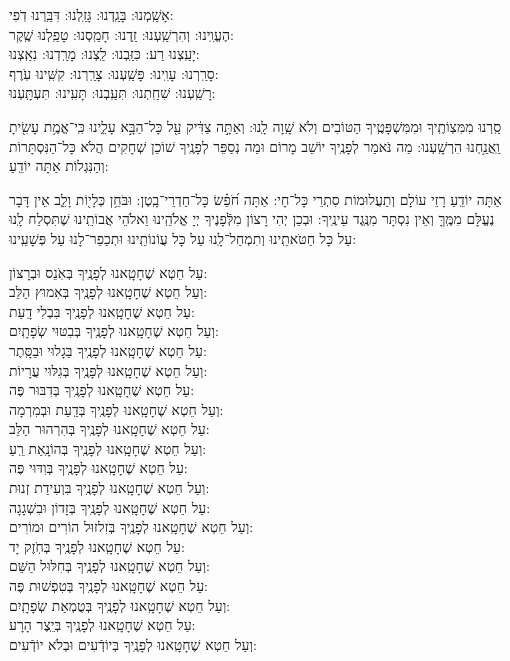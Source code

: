 \documentclass[twoside, openany, parskip=half, 11pt]{book}
\begin{document}
			אָשַֽׁמְנוּ: 	בָּגַֽדְנוּ: 	גָּזַֽלְנוּ: 	דִּבַּֽרְנוּ דֹֽפִי: \\
		הֶעֱוִֽינוּ: 	וְהִרְשַֽׁעְנוּ: 	זַֽדְנוּ: 		חָמַֽסְנוּ: 	טָפַֽלְנוּ שֶֽׁקֶר:\\
		יָעַֽצְנוּ רַע: 	כִּזַּֽבְנוּ: 	לַֽצְנוּ: 	מָרַֽדְנוּ: 	נִאַֽצְנוּ: \\	
		סָרַֽרְנוּ: 	עָוִֽינוּ: 	פָּשַֽׁעְנוּ: 	צָרַֽרְנוּ: 	קִשִּֽׁינוּ עֹֽרֶף:\\ 
		רָשַֽׁעְנוּ: 	שִׁחַֽתְנוּ: 	תִּעַֽבְנוּ: 	תָּעִֽינוּ: 	תִּעְתָּֽעְנוּ: 

 סַֽרְנוּ מִמִּצְוֹתֶֽיךָ וּמִמִּשְׁפָּטֶֽיךָ הַטּוֹבִים וְלֹא שָֽׁוָה לָֽנוּ: וְאַתָּ֣ה צַדִּ֔יק עַ֖ל כָּל־הַבָּ֣א עָלֵ֑ינוּ כִּֽי־אֱמֶ֥ת עָשִׂ֖יתָ וַֽאֲנַ֥חְנוּ הִרְשָֽׁעְנוּ: מַה נֹּאמַר לְפָנֶֽיךָ יוֹשֵׁב מָרוֹם וּמַה נְסַפֵּר לְפָנֶֽיךָ שׁוֹכֵן שְׁחָקִים הֲלֹא כָּל־הַנִּסְתָּרוֹת וְהַנִּגְלוֹת אַתָּה יוֹדֵֽעַ:
 
אַתָּה יוֹדֵֽעַ רָזֵי עוֹלָם וְתַעֲלוּמוֹת סִתְרֵי כָּל־חָי: אַתָּה חֹ֝פֵ֗שׂ כָּל־חַדְרֵי־בָֽטֶן: וּבֹּחֵ֥ן כְּלָי֖וֹת וָלֵ֑ב אֵין דָּבָר נֶעֱלָּם מִמֶּֽךָּ וְאֵין נִסְתָּר מִנֶּֽגֶד עֵינֶֽיךָ: וּבְכֵן יְהִי רָצוֹן מִלְּֿפָנֶיךָ יְיָ אֱלֹהֵֽינוּ וֵאלֹהֵי אֲבוֹתֵֽינוּ שֶׁתִּסְלַח לָֽנוּ עַל כָּל חַטֹּאתֵֽינוּ וְתִמְחַל־לָֽנוּ עַל כָּל עֲוֹנוֹתֵֽינוּ וּתְכַפֵר־לָנוּ עַל פְּשָׁעֵֽינוּ:



עַל חֵטְא שֶׁחָטָֽאנוּ לְפָנֶֽיךָ בְּאֹֽנֵס וּבְרָצוֹן:\\ 	וְעַל חֵטְא שֶׁחָטָֽאנוּ לְפָנֶֽיךָ בְּאִמוּץ הַלֵּב:	\\
עַל חֵטְא שֶׁחָטָֽאנוּ לְפָנֶֽיךָ בִּבְלִי דָֽעַת: \\	וְעַל חֵטְא שֶׁחָטָֽאנוּ לְפָנֶֽיךָ בְּבִטּוּי שְׂפָתָֽיִם:\\
עַל חֵטְא שֶׁחָטָֽאנוּ לְפָנֶֽיךָ בַּגָלוּי וּבַסָּֽתֶר: \\	וְעַל חֵטְא שֶׁחָטָֽאנוּ לְפָנֶֽיךָ בְּגִלּוּי עֲרָיוֹת:	\\
עַל חֵטְא שֶׁחָטָֽאנוּ לְפָנֶֽיךָ בְּדִבּוּר פֶּה: \\ 	וְעַל חֵטְא שֶׁחָטָֽאנוּ לְפָנֶֽיךָ בְּדַֽעַת וּבְמִרְמָה: \\
עַל חֵטְא שֶׁחָטָֽאנוּ לְפָנֶֽיךָ בְּהִרְהוּר הַלֵּב: \\	וְעַל חֵטְא שֶׁחָטָֽאנוּ לְפָנֶֽיךָ בְּהוֹנָֽאַת רֵֽעַ:	\\
עַל חֵטְא שֶׁחָטָֽאנוּ לְפָנֶֽיךָ בְּוִדּוּי פֶּה:\\	וְעַל חֵטְא שֶׁחָטָֽאנוּ לְפָנֶֽיךָ בִּוְעִידַת זְנוּת:	\\
עַל חֵטְא שֶׁחָטָֽאנוּ לְפָנֶֽיךָ בְּזָדוֹן וּבִשְׁגָגָה: \\	וְעַל חֵטְא שֶׁחָטָֽאנוּ לְפָנֶֽיךָ בְּזִלזוּל הוֹרִים וּמוֹרִים:\\
עַל חֵטְא שֶׁחָטָֽאנוּ לְפָנֶֽיךָ בְּחֹֽזֶק יָד: \\ 	וְעַל חֵטְא שֶׁחָטָֽאנוּ לְפָנֶֽיךָ בְּחִלּוּל הַשֵּׁם:	\\
עַל חֵטְא שֶׁחָטָֽאנוּ לְפָנֶֽיךָ בְּטִפְשׁוּת פֶּה: \\ 	וְעַל חֵטְא שֶׁחָטָֽאנוּ לְפָנֶֽיךָ בְּטֻמְאַת שְׂפָתָֽיִם:	\\
עַל חֵטְא שֶׁחָטָֽאנוּ לְפָנֶֽיךָ בְּיֵֽצֶר הָרָע: \\	וְעַל חֵטְא שֶׁחָטָֽאנוּ לְפָנֶֽיךָ בְּיוֹדְֿעִים וּבְלֹא יוֹדְֿעִים:
\end{document}

